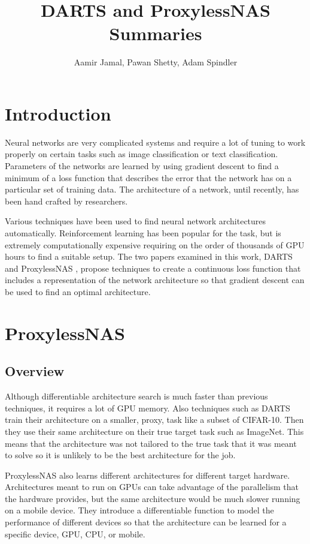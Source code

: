 \documentclass{ieee}
\title{DARTS and ProxylessNAS Summaries}
\author{Aamir Jamal, Pawan Shetty, Adam Spindler}
\begin{document}
\maketitle

\section{Introduction}
Neural networks are very complicated systems and require a lot of tuning to work properly on certain tasks such as image classification or text classification. Parameters of the networks are learned by using gradient descent to find a minimum of a loss function that describes the error that the network has on a particular set of training data. The architecture of a network, until recently, has been hand crafted by researchers. 

Various techniques have been used to find neural network architectures automatically. Reinforcement learning has been popular for the task, but is extremely computationally expensive requiring on the order of thousands of GPU hours to find a suitable setup. The two papers examined in this work, DARTS \cite{liu2018darts} and ProxylessNAS \cite{cai2018proxylessnas}, propose techniques to create a continuous loss function that includes a representation of the network architecture so that gradient descent can be used to find an optimal architecture.

\section{ProxylessNAS}
\subsection{Overview}
Although differentiable architecture search is much faster than previous techniques, it requires a lot of GPU memory. Also techniques such as DARTS train their architecture on a smaller, proxy, task like a subset of CIFAR-10. Then they use their same architecture on their true target task such as ImageNet. This means that the architecture was not tailored to the true task that it was meant to solve so it is unlikely to be the best architecture for the job.

ProxylessNAS also learns different architectures for different target hardware. Architectures meant to run on GPUs can take advantage of the parallelism that the hardware provides, but the same architecture would be much slower running on a mobile device. They introduce a differentiable function to model the performance of different devices so that the architecture can be learned for a specific device, GPU, CPU, or mobile. 
\end{document}
